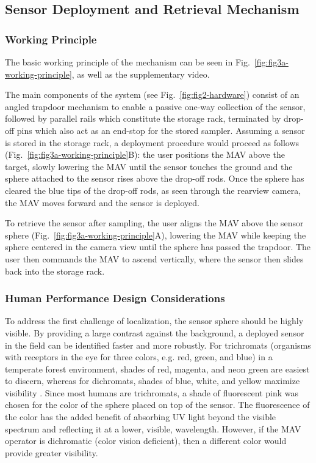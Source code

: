 \subsection{Sensor Deployment and Retrieval Mechanism}

\subsubsection{Working Principle}

The basic working principle of the mechanism can be seen in Fig.~\ref{fig:fig3a-working-principle}, as well as the supplementary video.

The main components of the system (see Fig.~\ref{fig:fig2-hardware}) consist of an angled trapdoor mechanism to enable a passive one-way collection of the sensor, followed by parallel rails which constitute the storage rack, terminated by drop-off pins which also act as an end-stop for the stored sampler. Assuming a sensor is stored in the storage rack, a deployment procedure would proceed as follows (Fig.~\ref{fig:fig3a-working-principle}B): the user positions the \gls{MAV} above the target, slowly lowering the \gls{MAV} until the sensor touches the ground and the sphere attached to the sensor rises above the drop-off rods. Once the sphere has cleared the blue tips of the drop-off rods, as seen through the rearview camera, the \gls{MAV} moves forward and the sensor is deployed.

To retrieve the sensor after sampling, the user aligns the \gls{MAV} above the sensor sphere (Fig.~\ref{fig:fig3a-working-principle}A), lowering the \gls{MAV} while keeping the sphere centered in the camera view until the sphere has passed the trapdoor. The user then commands the \gls{MAV} to ascend vertically, where the sensor then slides back into the storage rack.

\subsubsection{Human Performance Design Considerations}

To address the first challenge of localization, the sensor sphere should be highly visible. By providing a large contrast against the background, a deployed sensor in the field can be identified faster and more robustly.
For trichromats (organisms with receptors in the eye for three colors, e.g. red, green, and blue) in a temperate forest environment, shades of red, magenta, and neon green are easiest to discern, whereas for dichromats, shades of blue, white, and yellow maximize visibility \cite{Fennell2019}. Since most humans are trichromats, a shade of fluorescent pink was chosen for the color of the sphere placed on top of the sensor. The fluorescence of the color has the added benefit of absorbing UV light beyond the visible spectrum and reflecting it at a lower, visible, wavelength. However, if the \gls{MAV} operator is dichromatic (color vision deficient), then a different color would provide greater visibility. 

